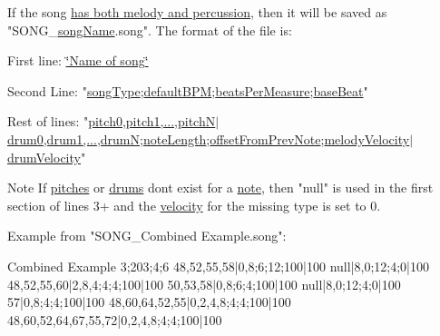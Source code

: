 If the song \hyperlink{group___song_management_DocSongCombined}{has both melody and percussion}, then it will be saved as "S\+O\+N\+G\+\_\+\hyperlink{group___song_priv_var_ga6a5e6c1e4aa92939e2b5c1e3d9908df8}{song\+Name}.song". The format of the file is\+: \begin{DoxyItemize}
\item First line\+: \hyperlink{group___song_priv_var_ga6a5e6c1e4aa92939e2b5c1e3d9908df8}{\char`\"{}\+Name of song\char`\"{}} \item Second Line\+: "\hyperlink{group___song_enums_gae681a1f001333e39fc1cb4fea97bfe1b}{song\+Type};\hyperlink{group___audio_DefBPM}{default\+B\+PM};\hyperlink{group___music_structs_acda79d249e7a1974a152832a881e9f0b}{beats\+Per\+Measure};\hyperlink{group___music_structs_aaf5b010a2541959c26f96630db042ee8}{base\+Beat}" \item Rest of lines\+: "\hyperlink{group___music_structs_aab23b49ea9d7961aef5091154ce45946}{pitch0,pitch1,...,pitchN}$|$\hyperlink{group___music_structs_a11ba5b49d8ee25941337573029660f25}{drum0,drum1,...,drumN};\hyperlink{group___music_structs_ac35cd02f5b3c00e3040b51e40e9e6c94}{note\+Length};\hyperlink{group___music_structs_ae281187907aed4c728c7981300dbebaf}{offset\+From\+Prev\+Note};\hyperlink{group___music_structs_a0c87d54ce8d28ea08fb4a526cb821c20}{melody\+Velocity}$|$\hyperlink{group___music_structs_a98181a53f924736c2df08f886cffed7d}{drum\+Velocity}" \begin{DoxyNote}{Note}
If \hyperlink{group___music_enums_ga508f69b199ea518f935486c990edac1d}{pitches} or \hyperlink{group___music_enums_gade475b4382c7066d1af13e7c13c029b6}{drums} don\textquotesingle{}t exist for a \hyperlink{group___music_structs_struct_music_1_1_combined_note}{note}, then "null" is used in the first section of lines 3+ and the \hyperlink{group___audio_DefVel}{velocity} for the missing type is set to 0. 
\end{DoxyNote}
\item Example from "S\+O\+N\+G\+\_\+\+Combined Example.\+song"\+: \begin{DoxyVerb}Combined Example
3;203;4;6
48,52,55,58|0,8;6;12;100|100
null|8,0;12;4;0|100
48,52,55,60|2,8,4;4;4;100|100
50,53,58|0,8;6;4;100|100
null|8,0;12;4;0|100
57|0,8;4;4;100|100
48,60,64,52,55|0,2,4,8;4;4;100|100
48,60,52,64,67,55,72|0,2,4,8;4;4;100|100
\end{DoxyVerb}
 \end{DoxyItemize}
